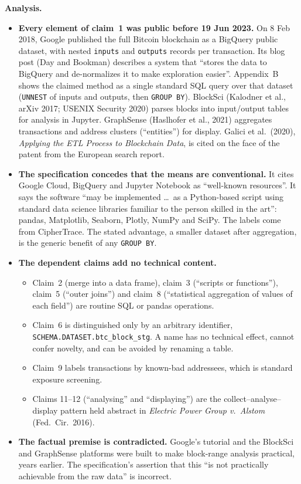 \documentclass[10pt,a4paper]{article}
\begin{document}
\noindent\textbf{Analysis.}
\begin{itemize}
  \item \textbf{Every element of claim~1 was public before 19 Jun 2023.} On 8 Feb 2018, Google published the full Bitcoin blockchain as a BigQuery public dataset, with nested \texttt{inputs} and \texttt{outputs} records per transaction. Its blog post (Day and Bookman) describes a system that ``stores the data to BigQuery and de-normalizes it to make exploration easier''. Appendix~B shows the claimed method as a single standard SQL query over that dataset (\texttt{UNNEST} of inputs and outputs, then \texttt{GROUP BY}). BlockSci (Kalodner et al., arXiv 2017; USENIX Security 2020) parses blocks into input/output tables for analysis in Jupyter. GraphSense (Haslhofer et al., 2021) aggregates transactions and address clusters (``entities'') for display. Galici et al.\ (2020), \emph{Applying the ETL Process to Blockchain Data}, is cited on the face of the patent from the European search report.
  \item \textbf{The specification concedes that the means are conventional.} It cites Google Cloud, BigQuery and Jupyter Notebook as ``well-known resources''. It says the software ``may be implemented \ldots\ as a Python-based script using standard data science libraries familiar to the person skilled in the art'': pandas, Matplotlib, Seaborn, Plotly, NumPy and SciPy. The labels come from CipherTrace. The stated advantage, a smaller dataset after aggregation, is the generic benefit of any \texttt{GROUP BY}.
  \item \textbf{The dependent claims add no technical content.}
  \begin{itemize}
    \item Claim~2 (merge into a data frame), claim~3 (``scripts or functions''), claim~5 (``outer joins'') and claim~8 (``statistical aggregation of values of each field'') are routine SQL or pandas operations.
    \item Claim~6 is distinguished only by an arbitrary identifier, \texttt{SCHEMA.DATASET.btc\_block\_stg}. A name has no technical effect, cannot confer novelty, and can be avoided by renaming a table.
    \item Claim~9 labels transactions by known-bad addressees, which is standard exposure screening.
    \item Claims 11--12 (``analysing'' and ``displaying'') are the collect--analyse--display pattern held abstract in \emph{Electric Power Group v.\ Alstom} (Fed.\ Cir.\ 2016).
  \end{itemize}
  \item \textbf{The factual premise is contradicted.} Google's tutorial and the BlockSci and GraphSense platforms were built to make block-range analysis practical, years earlier. The specification's assertion that this ``is not practically achievable from the raw data'' is incorrect.
\end{itemize}
\end{document}
